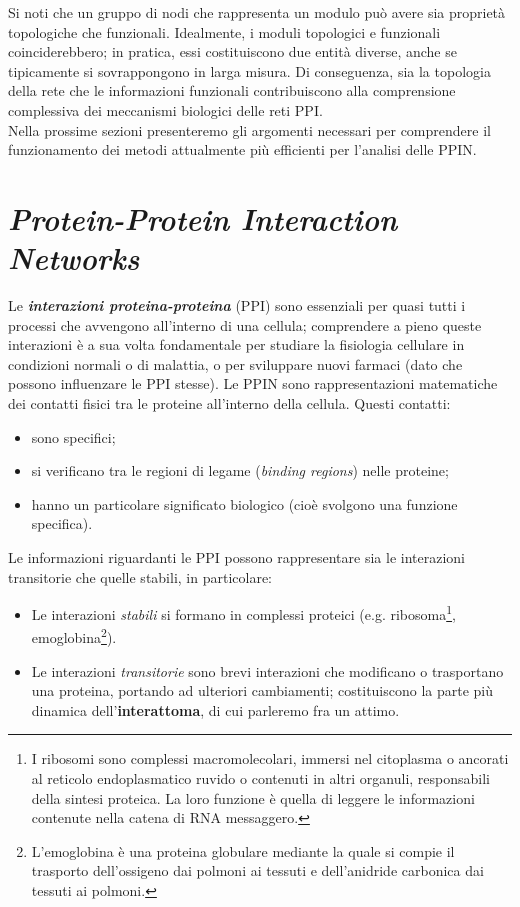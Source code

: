 \documentclass[11pt]{article}
\begin{document}
Si noti che un gruppo di nodi che rappresenta un modulo può avere sia proprietà topologiche che funzionali. Idealmente, i moduli topologici e funzionali coinciderebbero; in pratica, essi costituiscono due entità diverse, anche se tipicamente si sovrappongono in larga misura. Di conseguenza, sia la topologia della rete che le informazioni funzionali contribuiscono alla comprensione complessiva dei meccanismi biologici delle reti PPI.\\

Nella prossime sezioni presenteremo gli argomenti necessari per comprendere il funzionamento dei metodi attualmente più efficienti per l'analisi delle PPIN.

\newpage
\section{\textit{Protein-Protein Interaction Networks}}
Le \textit{\textbf{interazioni proteina-proteina}} (PPI) sono essenziali per quasi tutti i processi che avvengono all'interno di una cellula; comprendere a pieno queste interazioni è a sua volta fondamentale per studiare la fisiologia cellulare in condizioni normali o di malattia, o per sviluppare nuovi farmaci (dato che possono influenzare le PPI stesse). Le PPIN sono rappresentazioni matematiche dei contatti fisici tra le proteine all'interno della cellula. Questi contatti:
\begin{itemize}
\setlength{\itemsep}{1pt}
  \setlength{\parskip}{0pt}
  \setlength{\parsep}{0pt}
\item sono specifici;
\item si verificano tra le regioni di legame (\textit{binding regions}) nelle proteine;
\item hanno un particolare significato biologico (cioè svolgono una funzione specifica).
\end{itemize}
Le informazioni riguardanti le PPI possono rappresentare sia le interazioni transitorie che quelle stabili, in particolare:
\begin{itemize}
\setlength{\itemsep}{1pt}
  \setlength{\parskip}{0pt}
  \setlength{\parsep}{0pt}
\item Le interazioni \textit{stabili} si formano in complessi proteici (e.g. ribosoma\footnote{I ribosomi sono complessi macromolecolari, immersi nel citoplasma o ancorati al reticolo endoplasmatico ruvido o contenuti in altri organuli, responsabili della sintesi proteica. La loro funzione è quella di leggere le informazioni contenute nella catena di RNA messaggero.}, emoglobina\footnote{L'emoglobina è una proteina globulare mediante la quale si compie il trasporto dell'ossigeno dai polmoni ai tessuti e dell'anidride carbonica dai tessuti ai polmoni.}).
\item Le interazioni \textit{transitorie} sono brevi interazioni che modificano o trasportano una proteina, portando ad ulteriori cambiamenti; costituiscono la parte più dinamica dell'\textbf{interattoma}, di cui parleremo fra un attimo.
\end{itemize}
\end{document}
